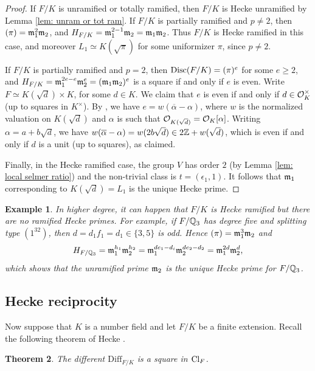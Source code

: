 \documentclass[11pt,a4paper]{amsart}
\def\Z{{\rm \mathbb{Z}}}
\def\Q{{\rm \mathbb{Q}}}
\def\m{{\rm \mathfrak{m}}}
\def\O{{\rm \mathcal{O}}}
\def\Cl{{\rm Cl}}
\def\Disc{{\rm Disc}}
\numberwithin{equation}{section}
\newtheorem{theorem}{Theorem}[section]
\newtheorem{example}[theorem]{Example}
\begin{document}
\begin{proof}
    If $F/K$ is unramified or totally ramified, then $F/K$ is Hecke unramified by Lemma \ref{lem: unram or tot ram}. If $F/K$ is partially ramified and $p \neq 2$, then $(\pi) = \m_1^2\m_2$, and $H_{F/K} = \m_1^{2-1}\m_2 = \m_1\m_2$. Thus $F/K$ is Hecke ramified in this case, and moreover $L_1 \simeq K(\sqrt{\pi})$ for some uniformizer $\pi$, since $p \neq 2$.
    
    If $F/K$ is partially ramified and $p = 2$, then $\Disc(F/K) = (\pi)^e$ for some $e \geq 2$, and $H_{F/K} = \m_1^{2e - e}\m_2^e = (\m_1\m_2)^e$ is a square if and only if $e$ is even. Write $F \simeq K(\sqrt{d}) \times K$, for some $d \in K$. We claim that $e$ is even if and only if $d \in \O_K^\times$ (up to squares in $K^\times$). By \cite[p.\ 64]{Serre1979}, we have $e = w(\overline{\alpha} - \alpha)$, where $w$ is the normalized valuation on $K(\sqrt{d})$ and $\alpha$ is such that $\O_{K(\sqrt{d})} = \O_K[\alpha]$. Writing $\alpha = a + b\sqrt{d}$, we have $w(\overline{\alpha} - \alpha) = w(2b\sqrt{d}) \in 2\Z + w(\sqrt{d})$, which is even if and only if $d$ is a unit (up to squares), as claimed. 

    Finally, in the Hecke ramified case, the group $V$ has order $2$ (by Lemma \ref{lem: local selmer ratio}) and the non-trivial class is $t = (\epsilon_1, 1)$. It follows that $\m_1$ corresponding to $K(\sqrt{d}) = L_1$ is the unique Hecke prime. 
\end{proof}


\begin{example}
    {\em 
    In higher degree, it can happen that $F/K$ is Hecke ramified but there are no {\it ramified} Hecke primes. For example, if $F/\Q_3$ has degree five and splitting type $(1^32)$,  then $d = d_1f_1 = d_1 \in \{3,5\}$ is odd. Hence $(\pi) = \m_1^3\m_2$ and 
    \[H_{F/\Q_3} = \m_1^{h_1}\m_2^{h_2} = \m_1^{de_1 - d_i}\m_2^{de_2 - d_2} = \m_1^{2d}\m_2^{d},\]
    which shows that the unramified prime $\m_2$ is the unique Hecke prime for $F/\Q_3$.
    }
\end{example}
\subsection{Hecke reciprocity}\label{subsec: Hecke reciprocity}
Now suppose that $K$ is a number field and let $F/K$ be a finite extension. Recall the following theorem of Hecke \cite[pg. 291]{WeilBasicNumberTheory}.

\begin{theorem}\label{thm: hecke}
    The different $\mathrm{Diff}_{F/K}$ is a square in $\Cl_F$.
\end{theorem}
\end{document}
